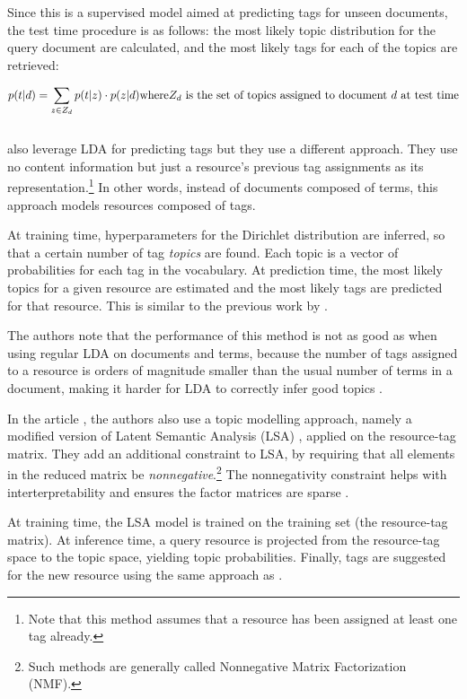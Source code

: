 Since this is a supervised model aimed at predicting tags for unseen documents, the test time procedure is as follows: the most likely topic distribution for the query document are calculated, and the most likely tags for each of the topics are retrieved:

$$
p(t | d ) = \sum_{z \in Z_d} p(t|z) \cdot p(z|d)

\textnormal{where} Z_d \ \textnormal{is the set of topics assigned to document} \ d \ \textnormal{at test time}
$$\\

\cite{krestel_fankhauser_2010} also leverage LDA for predicting tags but they use a different approach. They use no content information but just a resource's previous tag assignments as its representation.\footnote{Note that this method assumes that a resource has been assigned at least one tag already.} In other words, instead of documents composed of terms, this approach models resources composed of tags.

At training time, hyperparameters for the Dirichlet distribution are inferred, so that a certain number of tag \textit{topics} are found. Each topic is a vector of probabilities for each tag in the vocabulary. At prediction time, the most likely topics for a given resource are estimated and the most likely tags are predicted for that resource. This is similar to the previous work by \cite{si_sun_2008}.

The authors note that the performance of this method is not as good as when using regular LDA on documents and terms, because the number of tags assigned to a resource is orders of magnitude smaller than the usual number of terms in a document, making it harder for LDA to correctly infer good topics \citep{krestel_fankhauser_2010}.

In the article \cite{zhang_etal_2014}, the authors also use a topic modelling approach, namely a modified version of Latent Semantic Analysis (LSA) \citep{deerwester_etal_1990}, applied on the resource-tag matrix. They add an additional constraint to LSA, by requiring that all elements in the reduced matrix be \textit{nonnegative}.\footnote{Such methods are generally called Nonnegative Matrix Factorization (NMF).} The nonnegativity constraint helps with interterpretability and ensures the factor matrices are sparse \citep{gillis_2014}.

At training time, the LSA model is trained on the training set (the resource-tag matrix). At inference time, a query resource is projected from the resource-tag space to the topic space, yielding topic probabilities. Finally, tags are suggested for the new resource using the same approach as \cite{si_sun_2008}.


